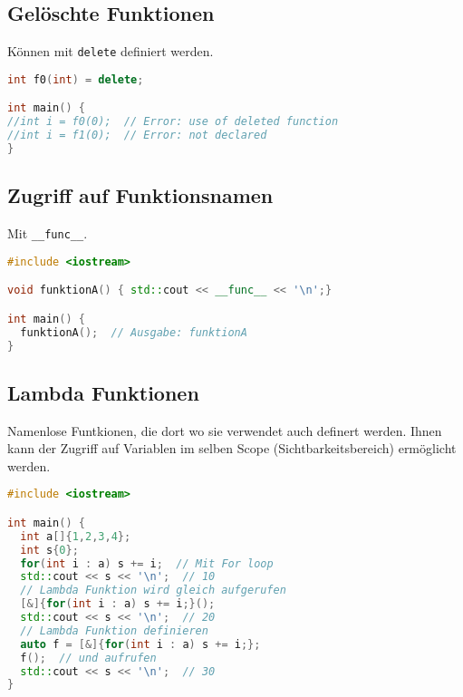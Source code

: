 \subsection{Gelöschte Funktionen}

Können mit \lstinline|delete| definiert werden.

\begin{lstlisting}[language=C++]
int f0(int) = delete;

int main() {
//int i = f0(0);  // Error: use of deleted function
//int i = f1(0);  // Error: not declared
}
\end{lstlisting}

\subsection{Zugriff auf Funktionsnamen}

Mit \lstinline|__func__|.

\begin{lstlisting}[language=C++]
#include <iostream>

void funktionA() { std::cout << __func__ << '\n';}

int main() {
  funktionA();  // Ausgabe: funktionA
}
\end{lstlisting}

\subsection{Lambda Funktionen}

Namenlose Funtkionen, die dort wo sie verwendet auch definert werden. Ihnen kann
der Zugriff auf Variablen im selben Scope (Sichtbarkeitsbereich) ermöglicht
werden.

\begin{lstlisting}[language=C++]
#include <iostream>

int main() {
  int a[]{1,2,3,4};
  int s{0};
  for(int i : a) s += i;  // Mit For loop
  std::cout << s << '\n';  // 10
  // Lambda Funktion wird gleich aufgerufen
  [&]{for(int i : a) s += i;}();
  std::cout << s << '\n';  // 20
  // Lambda Funktion definieren
  auto f = [&]{for(int i : a) s += i;};
  f();  // und aufrufen
  std::cout << s << '\n';  // 30
}
\end{lstlisting}

